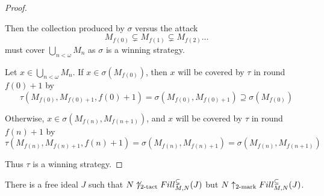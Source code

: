 \begin{proof}
\begin{itemize}
          Then the collection produced by $\sigma$ versus the attack 
            \[
              M_{f(0)}\subsetneq M_{f(1)} \subsetneq M_{f(2)} \dots
            \]
          must cover $\bigcup_{n<\omega}M_n$ as $\sigma$ is a winning strategy.

          Let $x \in \bigcup_{n<\omega}M_n$. If $x\in\sigma(M_{f(0)})$, then $x$ will be covered by $\tau$ in round $f(0)+1$ by
            \[
              \tau(M_{f(0)},M_{f(0)+1},f(0)+1)
              = \sigma(M_{f(0)},M_{f(0)+1})
              \supseteq \sigma(M_{f(0)})
            \]

          Otherwise, $x\in\sigma(M_{f(n)},M_{f(n+1)})$, and $x$ will be covered by $\tau$ in round $f(n)+1$ by
            \[
              \tau(M_{f(n)},M_{f(n)+1},f(n)+1)
              = \sigma(M_{f(n)},M_{f(n)+1})
              = \sigma(M_{f(n)},M_{f(n+1)})
            \]
      \end{itemize}

      Thus $\tau$ is a winning strategy.
  \end{proof}

  \begin{example}
    There is a free ideal $J$ such that $N\not\uparrow_{2\text{-tact}}Fill^{\subsetneq}_{M,N}(J)$ but $N\uparrow_{2\text{-mark}}Fill^{\subseteq}_{M,N}(J)$.
  \end{example}

